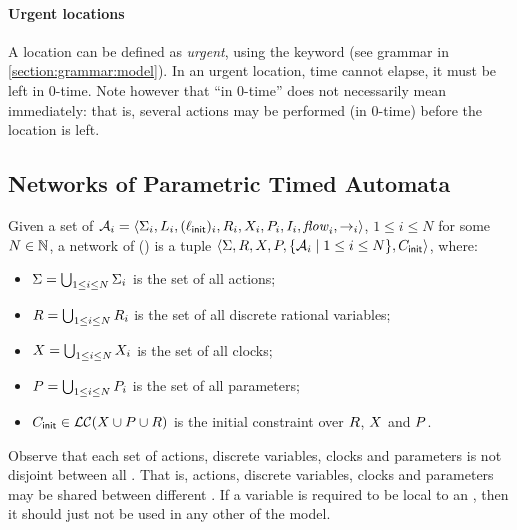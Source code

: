 \paragraph{Urgent locations}
A location can be defined as \emph{urgent}, using the keyword  (see grammar in  \cref{section:grammar:model}).
In an urgent location, time cannot elapse, \ie{} it must be left in $0$-time.
Note however that ``in $0$-time'' does not necessarily mean immediately: that is, several actions may be performed (in $0$-time) before the location is left.





\subsection{Networks of \imitator{} Parametric Timed Automata}

\begin{definition}[\NIPTA{}]
	Given a set of \IPTA{} $\mathcal{A}_i = \langle\Sigma_i, L_i, (\ell_{\textsf{init}})_i, R_i, X_i, P_i, I_i, \mathit{flow}_i, {\rightarrow}_i\rangle$, $1 \leq i \leq N$ for some $N \in \mathbb N$,
	a network of \IPTA{} (\emph{\NIPTA{}}) is a tuple
	$\langle\Sigma, R, X, P, \{ \mathcal{A}_i \mid 1 \leq i \leq N \}, C_{\textsf{init}}\rangle$, where:
	\begin{itemize}
		\item $\Sigma = \bigcup_{1 \leq i \leq N} \Sigma_i$ is the set of all actions;
		\item $R = \bigcup_{1 \leq i \leq N} R_i$ is the set of all discrete rational variables;
		\item $X = \bigcup_{1 \leq i \leq N} X_i$ is the set of all clocks;
		\item $P = \bigcup_{1 \leq i \leq N} P_i$ is the set of all parameters;
		\item $C_{\textsf{init}} \in \mathcal{LC}(X \cup P \cup R)$ is the initial constraint over $R$, $X$ and $P$. %
	\end{itemize}
\end{definition}

Observe that each set of actions, discrete variables, clocks and parameters is not disjoint between all \IPTA{}.
That is, actions, discrete variables, clocks and parameters may be shared between different \IPTA{}.
If a variable is required to be local to an \IPTA{}, then it should just not be used in any other \IPTA{} of the model.

